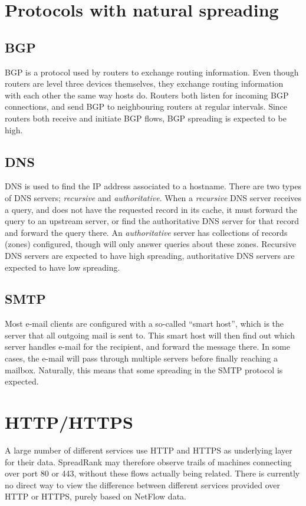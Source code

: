 \section{Protocols with natural spreading}
\label{sec:proto_spreading}
\subsection{BGP}
\Gls{BGP} is a protocol used by routers to exchange routing information.
Even though routers are level three devices themselves, they exchange routing information with each other the same way hosts do.
Routers both listen for incoming \gls{BGP} connections, and send \gls{BGP} to neighbouring routers at regular intervals.
Since routers both receive and initiate \gls{BGP} flows, \gls{BGP} \gls{spreading} is expected to be high.

\subsection{DNS}
DNS is used to find the IP address associated to a hostname.
There are two types of DNS servers; \emph{recursive} and \emph{authoritative}.
When a \emph{recursive} DNS server receives a query, and does not have the requested record in its cache,
 it must forward the query to an upstream server,
 or find the authoritative DNS server for that record and forward the query there.
An \emph{authoritative} server has collections of records (zones) configured,
 though will only answer queries about these zones.
Recursive DNS servers are expected to have high \gls{spreading}, authoritative DNS servers are expected to have low \gls{spreading}.


\subsection{SMTP}
Most e-mail clients are configured with a so-called ``smart host'',
 which is the server that all outgoing mail is sent to.
This smart host will then find out which server handles e-mail for the recipient, and forward the message there.
In some cases, the e-mail will pass through multiple servers before finally reaching a mailbox.
Naturally, this means that some \gls{spreading} in the SMTP protocol is expected.


\section{HTTP/HTTPS}
\label{sec:http}
A large number of different services use HTTP and HTTPS as underlying layer for their data.
SpreadRank may therefore observe trails of machines connecting over port 80 or 443,
 without these flows actually being related.
There is currently no direct way to view the difference between different services provided over HTTP or HTTPS, purely based on NetFlow data.

